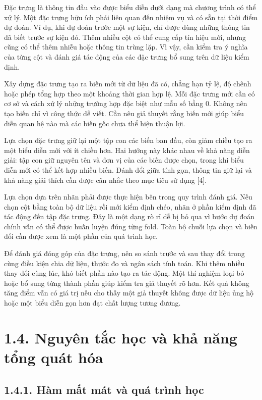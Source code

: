 Đặc trưng là thông tin đầu vào được biểu diễn dưới dạng mà chương trình có thể xử lý. Một đặc trưng hữu ích phải liên quan đến nhiệm vụ và có sẵn tại thời điểm dự đoán. Ví dụ, khi dự đoán trước một sự kiện, chỉ được dùng những thông tin đã biết trước sự kiện đó. Thêm nhiều cột có thể cung cấp tín hiệu mới, nhưng cũng có thể thêm nhiễu hoặc thông tin trùng lặp. Vì vậy, cần kiểm tra ý nghĩa của từng cột và đánh giá tác động của các đặc trưng bổ sung trên dữ liệu kiểm định.


Xây dựng đặc trưng tạo ra biến mới từ dữ liệu đã có, chẳng hạn tỷ lệ, độ chênh hoặc phép tổng hợp theo một khoảng thời gian hợp lệ. Mỗi đặc trưng mới cần có cơ sở và cách xử lý những trường hợp đặc biệt như mẫu số bằng 0. Không nên tạo biến chỉ vì công thức dễ viết. Cần nêu giả thuyết rằng biến mới giúp biểu diễn quan hệ nào mà các biến gốc chưa thể hiện thuận lợi.


Lựa chọn đặc trưng giữ lại một tập con các biến ban đầu, còn giảm chiều tạo ra một biểu diễn mới với ít chiều hơn. Hai hướng này khác nhau về khả năng diễn giải: tập con giữ nguyên tên và đơn vị của các biến được chọn, trong khi biểu diễn mới có thể kết hợp nhiều biến. Đánh đổi giữa tính gọn, thông tin giữ lại và khả năng giải thích cần được cân nhắc theo mục tiêu sử dụng [4].


Lựa chọn dựa trên nhãn phải được thực hiện bên trong quy trình đánh giá. Nếu chọn cột bằng toàn bộ dữ liệu rồi mới kiểm định chéo, nhãn ở phần kiểm định đã tác động đến tập đặc trưng. Đây là một dạng rò rỉ dễ bị bỏ qua vì bước dự đoán chính vẫn có thể được huấn luyện đúng từng fold. Toàn bộ chuỗi lựa chọn và biến đổi cần được xem là một phần của quá trình học.


Để đánh giá đóng góp của đặc trưng, nên so sánh trước và sau thay đổi trong cùng điều kiện chia dữ liệu, thước đo và ngân sách tính toán. Khi thêm nhiều thay đổi cùng lúc, khó biết phần nào tạo ra tác động. Một thí nghiệm loại bỏ hoặc bổ sung từng thành phần giúp kiểm tra giả thuyết rõ hơn. Kết quả không tăng điểm vẫn có giá trị nếu cho thấy một giả thuyết không được dữ liệu ủng hộ hoặc một biểu diễn gọn hơn đạt chất lượng tương đương.


\section{1.4. Nguyên tắc học và khả năng tổng quát hóa}

\subsection{1.4.1. Hàm mất mát và quá trình học}

